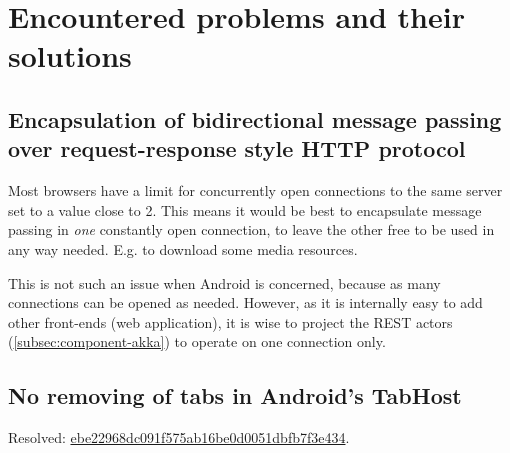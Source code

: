 %
%
%
%
%

\section{Encountered problems and their solutions}
\label{sec:impl-problems}

\subsection{Encapsulation of bidirectional message passing over request-response style HTTP protocol}
\label{subsec:problem-longpolling}


Most browsers have a limit for concurrently open connections to the same server set to a value close to 2. This means it would be best to encapsulate message passing in \emph{one} constantly open connection, to leave the other free to be used in any way needed. E.g. to download some media resources.

This is not such an issue when Android is concerned, because as many connections can be opened as needed. However, as it is internally easy to add other front-ends (web application), it is wise to project the REST actors (\cref{subsec:component-akka}) to operate on one connection only.

\subsection{No removing of tabs in Android's TabHost}
\label{subsec:problem-tabhost}


Resolved: \href{https://github.com/michalrus/agh-mindmap/commit/ebe22968dc091f575ab16be0d0051dbfb7f3e434}{ebe22968dc091f575ab16be0d0051dbfb7f3e434}.

